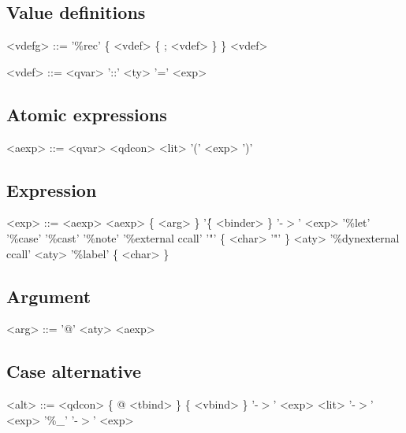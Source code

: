 \subsection*{Value definitions}

\begin{grammar}
 <vdefg> ::= '\%rec' \{ <vdef> \{ ; <vdef> \} \}
        \alt <vdef>
\end{grammar}

\begin{grammar}
 <vdef> ::= <qvar> '::' <ty> '=' <exp>
\end{grammar}

\subsection*{Atomic expressions}

\begin{grammar}
 <aexp> ::= <qvar>
       \alt <qdcon>
       \alt <lit>
       \alt '(' <exp> ')'
\end{grammar}

\subsection*{Expression}

\begin{grammar}
<exp> ::= <aexp>
     \alt <aexp> \{ <arg> \}
     \alt '\' \{ <binder> \} '-$>$' <exp>
     \alt '\%let' 
     \alt '\%case'
     \alt '\%cast'
     \alt '\%note'
     \alt '\%external ccall' '"' \{ <char> '"' \} <aty>
     \alt '\%dynexternal ccall' <aty>
     \alt '\%label' \{ <char> \}
\end{grammar}

\subsection*{Argument}

\begin{grammar}
<arg> ::= '@' <aty>
     \alt <aexp>
\end{grammar}

\subsection*{Case alternative}

\begin{grammar}
<alt> ::= <qdcon> \{ @ <tbind> \} \{ <vbind> \} '-$>$' <exp>
     \alt <lit> '-$>$' <exp>
     \alt '\%\_' '-$>$' <exp>
\end{grammar}

